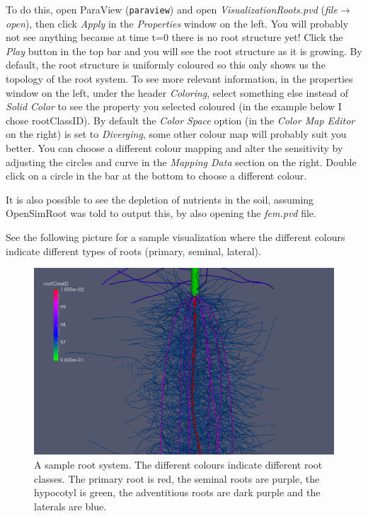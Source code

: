 \documentclass{article}
\begin{document}
\noindent To do this, open ParaView (\verb|paraview|) and open \textit{VisualizationRoots.pvd} (\textit{file}$\rightarrow$\textit{open}), then click \textit{Apply} in the \textit{Properties} window on the left. You will probably not see anything because at time t=0 there is no root structure yet! Click the \textit{Play} button in the top bar and you will see the root structure as it is growing. By default, the root structure is uniformly coloured so this only shows us the topology of the root system. To see more relevant information, in the properties window on the left, under the header \textit{Coloring}, select something else instead of \textit{Solid Color} to see the property you selected coloured (in the example below I chose rootClassID). By default the \textit{Color Space} option (in the \textit{Color Map Editor} on the right) is set to \textit{Diverging}, some other colour map will probably suit you better. You can choose a different colour mapping and alter the sensitivity by adjusting the circles and curve in the \textit{Mapping Data} section on the right. Double click on a circle in the bar at the bottom to choose a different colour. \newline

\noindent It is also possible to see the depletion of nutrients in the soil, assuming OpenSimRoot was told to output this, by also opening the \textit{fem.pvd} file. \newline

\noindent See the following picture for a sample visualization where the different colours indicate different types of roots (primary, seminal, lateral).

\begin{figure}[h]
\begin{center}
\includegraphics[scale=0.4]{test.pdf}
\caption{A sample root system. The different colours indicate different root classes. The primary root is red, the seminal roots are purple, the hypocotyl is green, the adventitious roots are dark purple and the laterals are blue.}
\end{center}
\end{figure}
\end{document}

